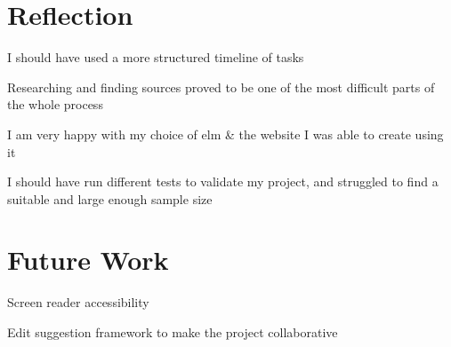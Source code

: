 \documentclass{l4proj}
\begin{document}
\section{Reflection}

I should have used a more structured timeline of tasks

Researching and finding sources proved to be one of the most difficult parts of the whole process

I am very happy with my choice of elm \& the website I was able to create using it

I should have run different tests to validate my project, and struggled to find a suitable and large enough sample size

\section{Future Work}

Screen reader accessibility

Edit suggestion framework to make the project collaborative

%
% 
\end{document}
